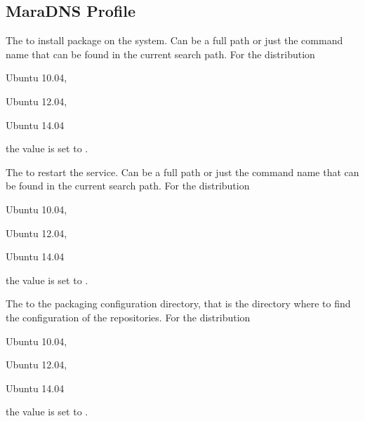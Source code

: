 \label{sec:maradns_profile}
\subsection{MaraDNS Profile}


The  to install package on the system. Can be a full path or
just the command name that can be found in the current search path. 
For the distribution
\begin{inparaitem}
\item[\TheDistribution{ubuntu}] Ubuntu 10.04,
\item[\TheDistribution{ubuntu}] Ubuntu 12.04,
\item[\TheDistribution{ubuntu}] Ubuntu 14.04
\end{inparaitem}
the value is set to .


The  to restart the service. Can be a full path or
just the command name that can be found in the current search path. 
For the distribution
\begin{inparaitem}
\item[\TheDistribution{ubuntu}] Ubuntu 10.04,
\item[\TheDistribution{ubuntu}] Ubuntu 12.04,
\item[\TheDistribution{ubuntu}] Ubuntu 14.04
\end{inparaitem}
the value is set to .


The  to the packaging configuration directory, that is the directory
where to find the configuration of the repositories.
For the distribution
\begin{inparaitem}
\item[\TheDistribution{ubuntu}] Ubuntu 10.04,
\item[\TheDistribution{ubuntu}] Ubuntu 12.04,
\item[\TheDistribution{ubuntu}] Ubuntu 14.04
\end{inparaitem}
the value is set to .

